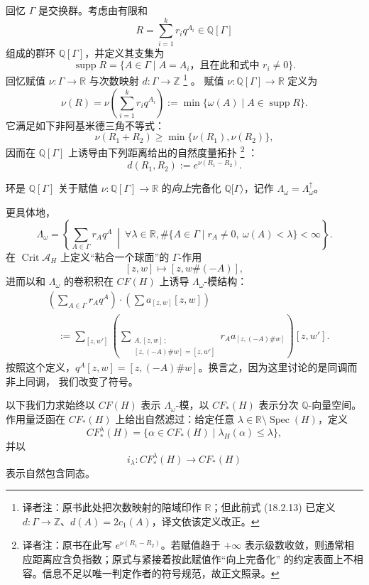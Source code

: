 回忆 $\Gamma$ 是交换群。考虑由有限和
\[
 R=\sum_{i=1}^{k}r_iq^{A_i}\in\mathbb Q[\Gamma]
\]
组成的群环 $\mathbb Q[\Gamma]$，并定义其支集为
\[
 \operatorname{supp}R=
 \{A\in\Gamma\mid A=A_i\text{，且在此和式中 }r_i\neq0\}.
\]
回忆赋值 $\nu:\Gamma\to\mathbb R$ 与次数映射 $d:\Gamma\to\mathbb Z$
\footnote{译者注：原书此处把次数映射的陪域印作 $\mathbb R$；但此前式 (18.2.13)
已定义 $d:\Gamma\to\mathbb Z$、$d(A)=2c_1(A)$，译文依该定义改正。}
。
赋值 $\nu:\mathbb Q[\Gamma]\to\mathbb R$ 定义为
\[
 \nu(R)=\nu\left(\sum_{i=1}^{k}r_iq^{A_i}\right)
 :=\min\{\omega(A)\mid A\in\operatorname{supp}R\}.
\]
它满足如下非阿基米德三角不等式：
\begin{equation}
 \nu(R_1+R_2)\geq\min\{\nu(R_1),\nu(R_2)\},
\label{eq:19-nonarch-triangle}
\end{equation}
因而在 $\mathbb Q[\Gamma]$ 上诱导由下列距离给出的自然度量拓扑
\footnote{译者注：原书在此写 $e^{\nu(R_1-R_2)}$。若赋值趋于 $+\infty$ 表示\personNovikov{}级数收敛，则通常相应距离应含负指数；原式与紧接着按此赋值作“向上完备化”
的约定表面上不相容。信息不足以唯一判定作者的符号规范，故正文照录。}
：
\[
 d(R_1,R_2):=e^{\nu(R_1-R_2)}.
\]

\begin{definition}
\label{def:novikov-ring-upward-completion}
\personNovikov{}环是 $\mathbb Q[\Gamma]$ 关于赋值
$\nu:\mathbb Q[\Gamma]\to\mathbb R$ 的\emph{向上}完备化
$\mathbb Q[\Gamma\rangle$，记作 $\Lambda_\omega=\Lambda_\omega^\uparrow$。
\end{definition}

更具体地，
\[
 \Lambda_\omega=
 \left\{\sum_{A\in\Gamma}r_Aq^A\ \middle|\
 \forall\lambda\in\mathbb R,
 \#\{A\in\Gamma\mid r_A\neq0,\ \omega(A)<\lambda\}<\infty\right\}.
\]
在 $\operatorname{Crit}\mathcal A_H$ 上定义“粘合一个球面”的 $\Gamma$-作用
\[
 [z,w]\longmapsto[z,w\#(-A)],
\]
进而以和 $\Lambda_\omega$ 的卷积积在 $CF(H)$ 上诱导 $\Lambda_\omega$-模结构：
\begin{equation}
\begin{aligned}
 &\left(\sum_{A\in\Gamma}r_Aq^A\right)
 \cdot\left(\sum a_{[z,w]}[z,w]\right)\\
 &\quad:=\sum_{[z,w']}
 \left(\sum_{\substack{A,[z,w]\,;\\{}[z,(-A)\#w]=[z,w']}}
 r_Aa_{[z,(-A)\#w]}\right)[z,w'].
\end{aligned}
\label{eq:19-convolution-action}
\end{equation}
按照这个定义，$q^A[z,w]=[z,(-A)\#w]$。换言之，因为这里讨论的是同调而非上同调，
我们改变了符号。

以下我们力求始终以 $CF(H)$ 表示 $\Lambda_\omega$-模，以 $CF_*(H)$ 表示分次
$\mathbb Q$-向量空间。作用量泛函在 $CF_*(H)$ 上给出自然滤过：给定任意
$\lambda\in\mathbb R\setminus\operatorname{Spec}(H)$，定义
\[
 CF_*^\lambda(H)=\{\alpha\in CF_*(H)\mid\lambda_H(\alpha)\leq\lambda\},
\]
并以
\[
 i_\lambda:CF_*^\lambda(H)\longrightarrow CF_*(H)
\]
表示自然包含同态。

